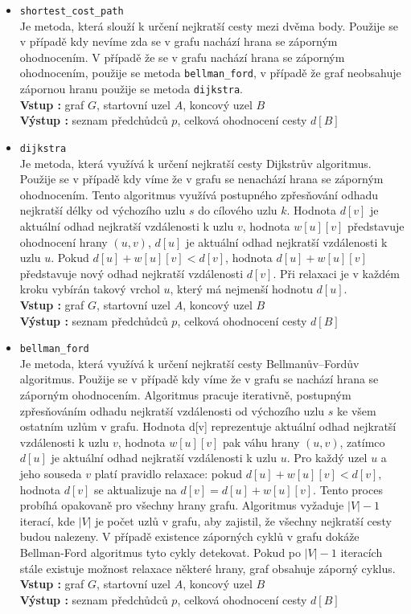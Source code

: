 \begin{itemize}
    \item \texttt{shortest\_cost\_path}\\
    Je metoda, která slouží k určení nejkratší cesty mezi dvěma body. Použije se v případě kdy nevíme zda se v grafu nachází hrana se záporným ohodnocením. V případě že se v grafu nachází hrana se záporným ohodnocením, použije se metoda \texttt{bellman\_ford}, v případě že graf neobsahuje zápornou hranu použije se metoda \texttt{dijkstra}.\\
    \textbf{Vstup : }graf $G$, startovní uzel $A$, koncový uzel $B$\\
    \textbf{Výstup : }seznam předchůdců $p$, celková ohodnocení cesty $d[B]$
    
    \item \texttt{dijkstra}\\
    Je metoda, která využívá k určení nejkratší cesty Dijkstrův algoritmus. Použije se v případě kdy víme že v grafu se nenachází hrana se záporným ohodnocením. Tento algoritmus využívá postupného zpřesňování odhadu nejkratší délky od výchozího uzlu $s$ do cílového uzlu $k$. Hodnota $d[v]$ je aktuální odhad nejkratší vzdálenosti k uzlu $v$, hodnota $w[u][v]$ představuje ohodnocení hrany $(u,v)$, $d[u]$ je aktuální odhad nejkratší vzdálenosti k uzlu $u$. Pokud $d[u]+w[u][v]<d[v]$, hodnota $d[u]+w[u][v]$ představuje nový odhad nejkratší vzdálenosti $d[v]$. Při relaxaci je v každém kroku vybírán takový vrchol $u$, který má nejmenší hodnotu $d[u]$\cite{Bayer2008}.\\
    \textbf{Vstup : }graf $G$, startovní uzel $A$, koncový uzel $B$\\
    \textbf{Výstup : }seznam předchůdců $p$, celková ohodnocení cesty $d[B]$

    \item \texttt{bellman\_ford}\\
    Je metoda, která využívá k určení nejkratší cesty Bellmanův–Fordův algoritmus. Použije se v případě kdy víme že v grafu se nachází hrana se záporným ohodnocením. Algoritmus pracuje iterativně, postupným zpřesňováním odhadu nejkratší vzdálenosti od výchozího uzlu $s$ ke všem ostatním uzlům v grafu. Hodnota d[v] reprezentuje aktuální odhad nejkratší vzdálenosti k uzlu $v$, hodnota $w[u][v]$ pak váhu hrany $(u, v)$, zatímco $d[u]$ je aktuální odhad nejkratší vzdálenosti k uzlu $u$. Pro každý uzel $u$ a jeho souseda $v$ platí pravidlo relaxace: pokud $d[u] + w[u][v] < d[v],$ hodnota $d[v]$ se aktualizuje na $d[v] = d[u] + w[u][v].$ Tento proces probíhá opakovaně pro všechny hrany grafu. Algoritmus vyžaduje $|V| - 1$ iterací, kde $|V|$ je počet uzlů v grafu, aby zajistil, že všechny nejkratší cesty budou nalezeny. V případě existence záporných cyklů v grafu dokáže Bellman-Ford algoritmus tyto cykly detekovat. Pokud po $|V| - 1$ iteracích stále existuje možnost relaxace některé hrany, graf obsahuje záporný cyklus.\\
    \textbf{Vstup : }graf $G$, startovní uzel $A$, koncový uzel $B$\\
    \textbf{Výstup : }seznam předchůdců $p$, celková ohodnocení cesty $d[B]$
\end{itemize}




